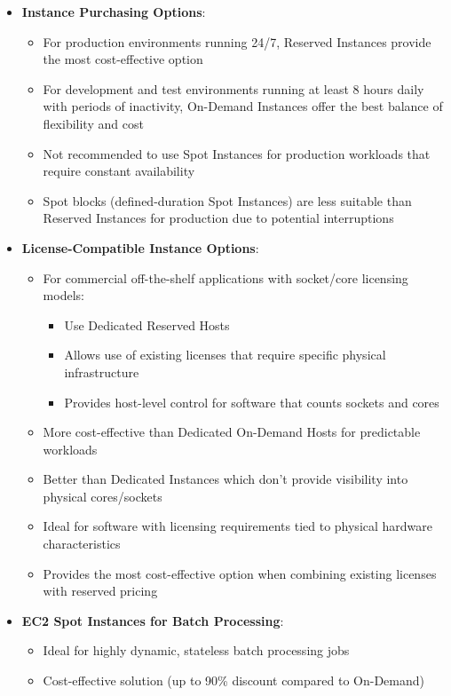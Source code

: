 \documentclass[11pt,a4paper]{report}
\begin{document}
\begin{itemize}
  \item \textbf{Instance Purchasing Options}:
\begin{itemize}
  \item For production environments running 24/7, Reserved Instances provide the most cost-effective option
  \item For development and test environments running at least 8 hours daily with periods of inactivity, On-Demand Instances offer the best balance of flexibility and cost
  \item Not recommended to use Spot Instances for production workloads that require constant availability
  \item Spot blocks (defined-duration Spot Instances) are less suitable than Reserved Instances for production due to potential interruptions
\end{itemize}
  \item \textbf{License-Compatible Instance Options}:
\begin{itemize}
  \item For commercial off-the-shelf applications with socket/core licensing models:
\begin{itemize}
  \item Use Dedicated Reserved Hosts
  \item Allows use of existing licenses that require specific physical infrastructure
  \item Provides host-level control for software that counts sockets and cores
\end{itemize}
  \item More cost-effective than Dedicated On-Demand Hosts for predictable workloads
  \item Better than Dedicated Instances which don't provide visibility into physical cores/sockets
  \item Ideal for software with licensing requirements tied to physical hardware characteristics
  \item Provides the most cost-effective option when combining existing licenses with reserved pricing
\end{itemize}
  \item \textbf{EC2 Spot Instances for Batch Processing}:
\begin{itemize}
  \item Ideal for highly dynamic, stateless batch processing jobs
  \item Cost-effective solution (up to 90\% discount compared to On-Demand)

\end{itemize}
\end{itemize}
\end{document}
